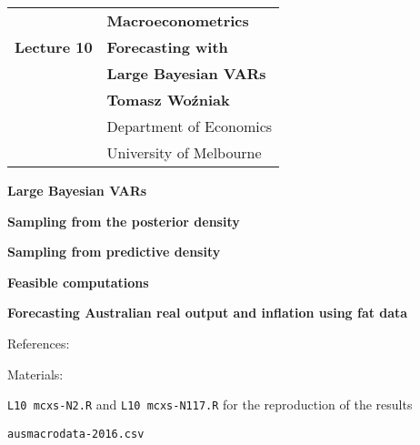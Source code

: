 \documentclass[notes,blackandwhite,mathsans,usenames,dvipsnames]{beamer}
\begin{document}







{
\begin{frame}

\vspace{1cm}
\begin{tabular}{rl}
&\textbf{\LARGE\color{mcxs2} Macroeconometrics}\\[8ex]
\textbf{\Large Lecture 10}&\textbf{\Large\color{mcxs5}Forecasting with}\\
&\textbf{\Large\color{mcxs5}Large Bayesian VARs}\\[16ex]
&\textbf{Tomasz Wo\'zniak}\\[1ex]
&{\small\color{mcxs5} Department of Economics}\\
&{\small\color{mcxs5}University of Melbourne}
\end{tabular}

\end{frame}
}






\begin{frame}

\bigskip\textbf{\color{purple}Large Bayesian VARs}

\bigskip\textbf{\color{mcxs2}Sampling from the posterior density}

\bigskip\textbf{\color{mcxs2}Sampling from predictive density}

\bigskip\textbf{\color{mcxs2}Feasible computations}

\bigskip\textbf{\color{purple}Forecasting Australian real output and inflation using fat data}


\small
\bigskip References: \scriptsize



\small
\bigskip Materials: \scriptsize

 \texttt{L10 mcxs-N2.R} {\color{mcxs2}and} \texttt{L10 mcxs-N117.R} {\color{mcxs2}for the reproduction of the results}

 \texttt{ausmacrodata-2016.csv}
\end{frame}
\end{document}
